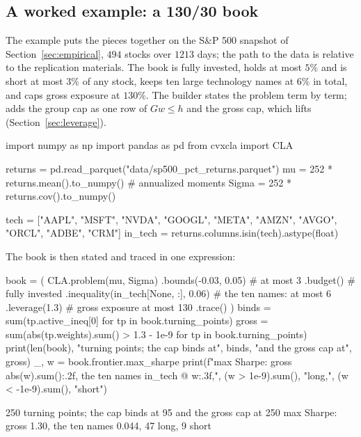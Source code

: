 \subsection{A worked example: a 130/30 book}
\label{sec:worked}

The example puts the pieces together on the S\&P 500 snapshot of
Section~\ref{sec:empirical}, $494$ stocks over $1213$ days; the path to the data is
relative to the replication materials. The book is fully invested,
holds at most $5\%$ and is short at most $3\%$ of any stock, keeps ten large technology
names at $6\%$ in total, and caps gross exposure at $130\%$. The builder
 states the problem term by term;  adds the group
cap as one row of $G w \le h$ and  the gross cap, which
 lifts (Section~\ref{sec:leverage}).

\begin{CodeChunk}
\begin{CodeInput}
import numpy as np
import pandas as pd
from cvxcla import CLA

returns = pd.read_parquet("data/sp500_pct_returns.parquet")
mu = 252 * returns.mean().to_numpy()            # annualized moments
Sigma = 252 * returns.cov().to_numpy()

tech = ["AAPL", "MSFT", "NVDA", "GOOGL", "META",
        "AMZN", "AVGO", "ORCL", "ADBE", "CRM"]
in_tech = returns.columns.isin(tech).astype(float)
\end{CodeInput}
\end{CodeChunk}

The book is then stated and traced in one expression:

\begin{CodeChunk}
\begin{CodeInput}
book = (
    CLA.problem(mu, Sigma)
    .bounds(-0.03, 0.05)                 # at most 3%
    .budget()                            # fully invested
    .inequality(in_tech[None, :], 0.06)  # the ten names: at most 6%
    .leverage(1.3)                       # gross exposure at most 130%
    .trace()
)
binds = sum(tp.active_ineq[0] for tp in book.turning_points)
gross = sum(abs(tp.weights).sum() > 1.3 - 1e-9 for tp in book.turning_points)
print(len(book), "turning points; the cap binds at", binds,
      "and the gross cap at", gross)
_, w = book.frontier.max_sharpe
print(f"max Sharpe: gross {abs(w).sum():.2f}, the ten names {in_tech @ w:.3f},",
      (w > 1e-9).sum(), "long,", (w < -1e-9).sum(), "short")
\end{CodeInput}
\begin{CodeOutput}
250 turning points; the cap binds at 95 and the gross cap at 250
max Sharpe: gross 1.30, the ten names 0.044, 47 long, 9 short
\end{CodeOutput}
\end{CodeChunk}


